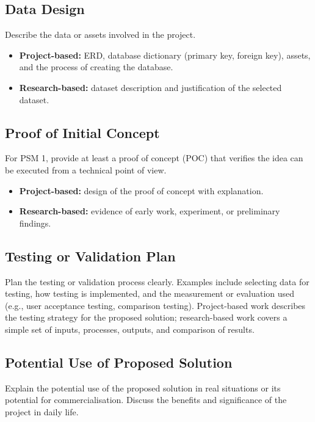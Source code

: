 \subsection{Data Design}

Describe the data or assets involved in the project.

\begin{itemize}
    \item \textbf{Project-based:} ERD, database dictionary (primary key, foreign key), assets, and the process of creating the database.
    \item \textbf{Research-based:} dataset description and justification of the selected dataset.
\end{itemize}

\subsection{Proof of Initial Concept}

For PSM 1, provide at least a proof of concept (POC) that verifies the idea can be executed from a technical point of view.

\begin{itemize}
    \item \textbf{Project-based:} design of the proof of concept with explanation.
    \item \textbf{Research-based:} evidence of early work, experiment, or preliminary findings.
\end{itemize}

\subsection{Testing or Validation Plan}

Plan the testing or validation process clearly. Examples include selecting data for testing, how testing is implemented, and the measurement or evaluation used (e.g., user acceptance testing, comparison testing). Project-based work describes the testing strategy for the proposed solution; research-based work covers a simple set of inputs, processes, outputs, and comparison of results.

\subsection{Potential Use of Proposed Solution}

Explain the potential use of the proposed solution in real situations or its potential for commercialisation. Discuss the benefits and significance of the project in daily life.

